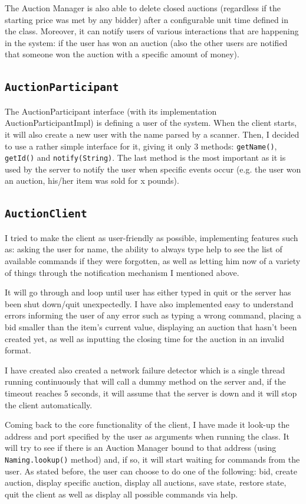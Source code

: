 \documentclass[11pt]{article}
\begin{document}
 The Auction Manager is also able to delete closed auctions (regardless if the starting price was met by any bidder) after a configurable unit time defined in the class. Moreover, it can notify users of various interactions that are happening in the system: if the user has won an auction (also the other users are notified that someone won the auction with a specific amount of money).
 
 \subsection{\texttt{AuctionParticipant}}
 The AuctionParticipant interface (with its implementation AuctionParticipantImpl) is defining a user of the system. When the client starts, it will also create a new user with the name parsed by a scanner. Then, I decided to use a rather simple interface for it, giving it only 3 methods: \texttt{getName()}, \texttt{getId()} and \texttt{notify(String)}. The last method is the most important as it is used by the server to notify the user when specific events occur (e.g. the user won an auction, his/her item was sold for x pounds).
 
 \subsection{\texttt{AuctionClient}}
 I tried to make the client as user-friendly as possible, implementing features such as: asking the user for name, the ability to always type help to see the list of available commands if they were forgotten, as well as letting him now of a variety of things through the notification mechanism I mentioned above.
 
 It will go through and loop until user has either typed in quit or the server has been shut down/quit unexpectedly. I have also implemented easy to understand errors informing the user of any error such as typing a wrong command, placing a bid smaller than the item's current value, displaying an auction that hasn't been created yet, as well as inputting the closing time for the auction in an invalid format.
 
 I have created also created a network failure detector which is a single thread running continuously that will call a dummy method on the server and, if the timeout reaches 5 seconds, it will assume that the server is down and it will stop the client automatically.
 
 Coming back to the core functionality of the client, I have made it look-up the address and port specified by the user as arguments when running the class. It will try to see if there is an Auction Manager bound to that address (using \texttt{Naming.lookup()} method) and, if so, it will start waiting for commands from the user. As stated before, the user can choose to do one of the following: bid, create auction, display specific auction, display all auctions, save state, restore state, quit the client as well as display all possible commands via help.
 
\end{document}
